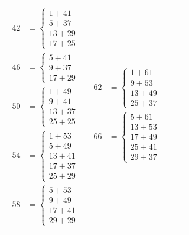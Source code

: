 \documentclass[12pt]{article}
\begin{document}
\begin{tabular}{l|l|l|l}
{    \begin{align*} 
      42 &= \begin{cases}
        1 + 41 \\5 + 37 \\ 13 + 29 \\ 17 + 25
      \end{cases}\\
      46 &= \begin{cases}
           5 + 41 \\ 9 + 37 \\ 17 + 29
        \end{cases} \\
      50 &= \begin{cases}
        1 + 49 \\ 9 + 41 \\ 13 + 37 \\ 25 + 25
      \end{cases} \\
      54 &= \begin{cases}
           1 + 53 \\ 5 + 49 \\ 13 + 41 \\ 17 + 37 \\ 25 + 29
        \end{cases} \\
      58 &= \begin{cases}
           5 + 53 \\ 9 + 49 \\ 17 + 41 \\ 29 + 29
        \end{cases}
    \end{align*}} &
\parbox[t]{0.2\linewidth}{%
    \vspace*{-\baselineskip}
    \begin{align*} 
      62 &= \begin{cases}
        1 + 61 \\ 9 + 53 \\ 13 + 49 \\ 25 + 37
      \end{cases} \\
      66 &= \begin{cases}
        5 + 61 \\ 13 + 53 \\ 17 + 49 \\ 25 + 41 \\ 29 + 37
      \end{cases} \\

\end{align*}}
\end{tabular}
\end{document}
